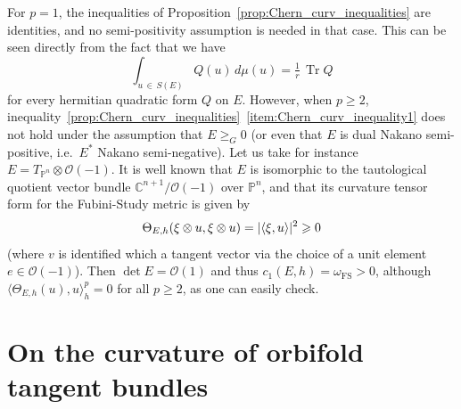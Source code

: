 \documentclass[AHL,Unicode,longabstracts,published]{cedram}
\DeclareMathOperator{\Tr}{Tr}
\DeclarePairedDelimiter{\abs}{\lvert}{\rvert}
\newcommand*\FS{\mathrm{FS}}
\newcommand*\cO{\mathcal{O}}
\newcommand*\bC{\mathbb{C}}
\newcommand*\bP{\mathbb{P}}
\let\geq\geqslant
\begin{document}
\begin{rema}\label{5.15}
For $p=1$, the inequalities of Proposition~\ref{prop:Chern_curv_inequalities} are identities, and no semi-positivity assumption is needed in that case. This can be seen directly from the fact that we have
\[
\int_{u\,\in\,S(E)}Q(u)\,d\mu(u)=\tfrac{1}{ r}\,\Tr Q
\]
for every hermitian quadratic form $Q$ on $E$. However, when $p\geq 2$, inequality~\ref{prop:Chern_curv_inequalities}~\eqref{item:Chern_curv_inequality1} does not hold under the assumption that
$E\geq_G0$ (or even that $E$ is dual Nakano semi-positive, i.e.\ $E^*$ Nakano semi-negative). Let us take for instance $E=T_{\bP^n}\otimes\cO(-1)$. It is well known that
$E$ is isomorphic to the tautological quotient vector bundle
$\bC^{n+1}/\cO(-1)$ over $\bP^n$, and that its curvature tensor form for the Fubini-Study metric is given by
\[
\Theta_{E,h}(\xi\otimes u,\xi\otimes u)=
\abs{\langle\xi,u\rangle}^2\geq 0
\]
(where $v$ is identified which a tangent vector via the choice of a unit element $e\in\cO(-1)$). Then $\det E=\cO(1)$ and thus
$c_1(E,h)=\omega_\FS>0$, although $\langle\Theta_{E,h}(u),u\rangle_h^p=0$ for all $p\geq 2$, as one can easily check.
\end{rema}

\section{On the curvature of orbifold tangent bundles}\label{se:curvature_tangent}
\end{document}
